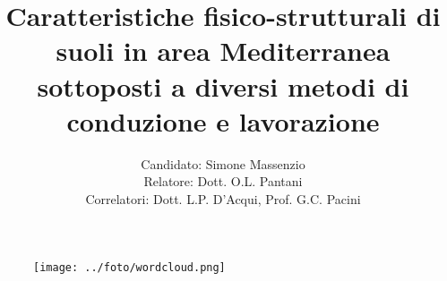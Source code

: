 \documentclass[10pt]{beamer}
\title[25 anni di conduzione biologica in area Mediterranea: uno
studio di fisica del suolo] %
{ Caratteristiche fisico-strutturali di suoli in area Mediterranea
  sottoposti a diversi metodi di conduzione e lavorazione}
\author[Simone Massenzio]{ 
  Candidato: Simone Massenzio \\
  Relatore: Dott. O.L. Pantani\\
  \vspace{0.1cm}
  Correlatori:
  Dott. L.P. D'Acqui, Prof. G.C. Pacini}
\institute[] { \emph{Dipartimento di Scienze della Produzioni Animali e
    dell'Ambiente\\
    Universit\`a degli studi di Firenze - UniFI\\}
  
}
\date{\displaydate{date}}
\begin{document}
{\1
  \begin{frame}[noframenumbering]%
    \titlepage
  \end{frame}}




\begin{frame}
  \vspace{2cm}
  \begin{figure}
    \centering
    \texttt{[image: ../foto/wordcloud.png]}
  \end{figure}
\end{frame}
\end{document}
